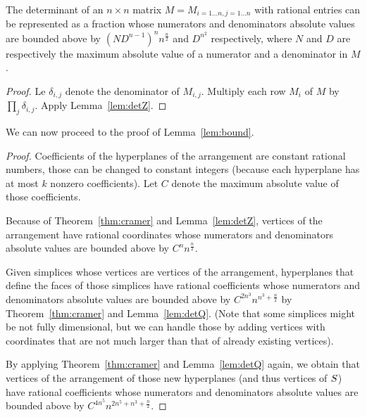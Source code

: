 \begin{lemma}\label{lem:detQ}
	The determinant of an $n\times n$ matrix $M = M_{i=1\ldots n,j=1\ldots n}$ with
	rational entries can be represented as a fraction whose numerators and
	denominators absolute values are bounded above by
	${(ND^{n-1})}^n n^{\frac n2}$ and $D^{n^2}$
	respectively, where $N$ and $D$
	are respectively the maximum absolute value of a numerator and a
	denominator in $M$.
\end{lemma}
\begin{proof}
	Le $\delta_{i,j}$ denote the denominator of $M_{i,j}$.
	Multiply each row $M_i$ of $M$ by $\prod_j \delta_{i,j}$.
	Apply Lemma~\ref{lem:detZ}.
\end{proof}

We can now proceed to the proof of Lemma~\ref{lem:bound}.
\begin{proof}
	Coefficients of the hyperplanes of the arrangement are constant rational
	numbers, those can be changed to constant integers (because each
	hyperplane has at most $k$ nonzero coefficients). Let $C$ denote the
	maximum absolute value of those coefficients.

	Because of Theorem~\ref{thm:cramer} and Lemma~\ref{lem:detZ}, vertices of
	the arrangement have rational coordinates whose numerators and
	denominators absolute values are bounded above by $C^n n^{\frac n2}$.

	Given simplices whose vertices are vertices of the arrangement, hyperplanes
	that define the faces of those simplices have rational coefficients whose
	numerators and denominators absolute values are bounded above by $C^{2n^3}
	n^{n^3+\frac n2}$ by Theorem~\ref{thm:cramer} and Lemma~\ref{lem:detQ}.
	(Note that some simplices might be not fully dimensional, but we can handle
	those by adding vertices with coordinates that are not much larger than
	that of already existing vertices).

	By applying Theorem~\ref{thm:cramer} and Lemma~\ref{lem:detQ} again, we
	obtain that vertices of the arrangement of those new hyperplanes (and thus
	vertices of $S$) have rational coefficients whose numerators and
	denominators absolute values are bounded above by $C^{4n^5} n^{2n^5+n^3+\frac n2}$.
\end{proof}
